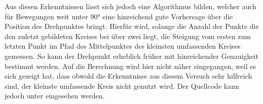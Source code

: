 Aus diesen Erkenntnissen lässt sich jedoch eine Algorithmus bilden, welcher auch für Bewegungen weit unter 90° eine hinreichend gute Vorhersage über die Position des Drehpunktes bringt.
Hierfür wird, solange die Anzahl der Punkte die den zuletzt gebildeten Kreises bei über zwei liegt, die Steigung vom ersten zum letzten Punkt im Pfad des Mittelpunktes des kleinsten umfassenden Kreises gemessen.
So kann der Drehpunkt erheblich früher mit hinreichender Genauigkeit bestimmt werden.
Auf die Berechnung wird hier nicht näher eingegangen, weil es sich gezeigt hat, dass obwohl die Erkenntnisse aus diesem Versuch sehr hilfreich sind, der kleinste umfassende Kreis nicht genutzt wird.
Der Quellcode kann jedoch unter %
eingesehen werden.








